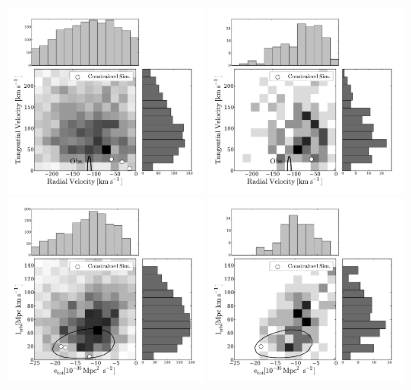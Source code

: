 \documentclass{emulateapj}
\begin{document}
\begin{figure}
\begin{center}
\includegraphics[keepaspectratio=true,width=0.46\textwidth]{./figures/test_rt_BDM.pdf}
\includegraphics[keepaspectratio=true,width=0.46\textwidth]{./figures/test_rt_BDM_narrow.pdf}
\includegraphics[keepaspectratio=true,width=0.46\textwidth]{./figures/test_EJ_BDM.pdf}
\includegraphics[keepaspectratio=true,width=0.46\textwidth]{./figures/test_EJ_BDM_narrow.pdf}

\end{center}
\end{figure}
\end{document}
